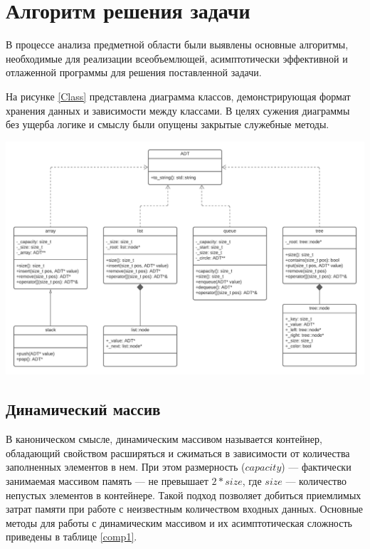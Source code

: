 \documentclass[a4paper,12pt]{article}
\begin{document}
\cleardoublepage

\section{Алгоритм решения задачи}

В процессе анализа предметной области были выявлены основные алгоритмы, необходимые для реализации всеобъемлющей, асимптотически эффективной и отлаженной программы для решения поставленной задачи.

На рисунке \ref{Class} представлена диаграмма классов, демонстрирующая формат хранения данных и зависимости между классами.
В целях сужения диаграммы без ущерба логике и смыслу были опущены закрытые служебные методы.

\includegraphics[width=\textwidth]{UML Class.pdf}

\label{Class}

\cleardoublepage

\subsection{Динамический массив}

В каноническом смысле, динамическим массивом называется контейнер, обладающий свойством расширяться и сжиматься в зависимости от количества заполненных элементов в нем.
При этом размерность ($capacity$) — фактически занимаемая массивом память — не превышает $2 * size$, где $size$ — количество непустых элементов в контейнере.
Такой подход позволяет добиться приемлимых затрат памяти при работе с неизвестным количеством входных данных.
Основные методы для работы с динамическим массивом и их асимптотическая сложность приведены в таблице \ref{comp1}.
\end{document}
